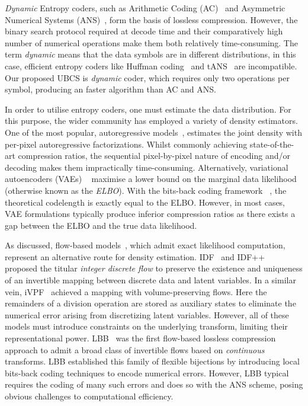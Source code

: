 \documentclass{article}
\begin{document}
{\em Dynamic} Entropy coders, such as Arithmetic Coding (AC)~\cite{witten1987arithmetic} and Asymmetric Numerical Systems (ANS)~\cite{duda2013asymmetric}, form the basis of lossless compression.  However, the binary search protocol required at decode time and their comparatively high number of numerical operations make them both relatively time-consuming. The term {\em dynamic} means that the data symbols are in different distributions, in this case, efficient entropy coders like Huffman coding~\cite{huffman1952method} and tANS~\cite{duda2013asymmetric} are incompatible. Our proposed UBCS is {\em dynamic} coder, which requires only two operations per symbol, producing an faster algorithm than AC and ANS.

In order to utilise entropy coders, one must estimate the data distribution. For this purpose, the wider community has employed a variety of density estimators. One of the most popular, autoregressive models~\cite{salimans2017pixelcnn++}, estimates the joint density with per-pixel autoregressive factorizations. Whilst commonly achieving state-of-the-art compression ratios, the sequential pixel-by-pixel nature of encoding and/or decoding makes them impractically time-consuming. 
Alternatively, variational autoencoders (VAEs) ~\cite{kingma2013auto,kingma2019bit,townsend2019hilloc} maximise a lower bound on the marginal data likelihood (otherwise known as the \textit{ELBO}). With the bits-back coding framework ~\cite{townsend2019practical}, the theoretical codelength is exactly equal to the ELBO. However, in most cases, VAE formulations typically produce inferior compression ratios as there exists a gap between the ELBO and the true data likelihood.





As discussed, flow-based models~\cite{ho2019flow++,kingma2018glow,dinh2016density}, which admit exact likelihood computation, represent an alternative route for density estimation. 
IDF~\cite{hoogeboom2019integer} and IDF++~\cite{berg2020idf++} proposed the titular \textit{integer discrete flow} to preserve the existence and uniqueness of an invertible mapping between discrete data and latent variables. In a similar vein, iVPF~\cite{zhang2021ivpf} achieved a mapping with volume-preserving flows. Here the remainders of a division operation are stored as auxiliary states to eliminate the numerical error arising from discretizing latent variables. However, all of these models must introduce constraints on the underlying transform, limiting their representational power. LBB~\cite{ho2019compression} was the first flow-based lossless compression approach to admit a broad class of invertible flows based on \textit{continuous} transforms. LBB established this family of flexible bijections by introducing local bits-back coding techniques to encode numerical errors. However, LBB typical requires the coding of many such errors and does so with the ANS scheme, posing obvious challenges to computational efficiency.
\end{document}
